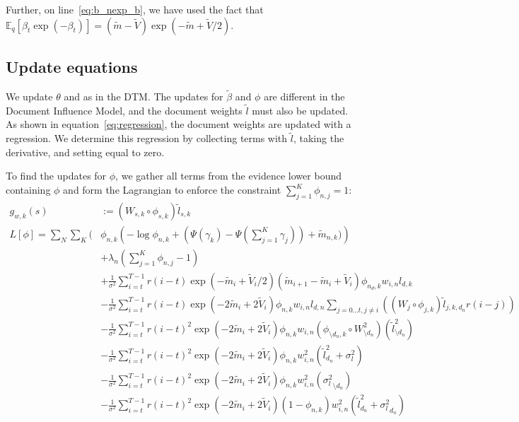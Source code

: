 \documentclass{article}
\newcommand{\mv}{\tilde{m}}
\newcommand{\vv}[0]{\tilde{V}}
\newcommand{\vphi}{\phi}
\newcommand{\bv}{\tilde{\beta}}
\newcommand{\lv}{\tilde{l}}
\newcommand{\vlv}{{\sigma^2_{l}}}
\newcommand{\expectq}[1]{\mathbb{E}_q\left[#1\right]}
\begin{document}
Further, on line~\ref{eq:b_nexp_b}, we have used the fact that
$\expectq{\beta_t \exp(-\beta_t)} = (\mv - \vv) \exp(-\mv + \vv / 2)$.

\subsection{Update equations} \label{section:updates}
We update $\theta$ and as in the DTM.  The updates for $\bv$
and $\vphi$ are different in the Document Influence Model, and the
document weights $\lv$ must also be updated.  As shown in
equation~\ref{eq:regression}, the document weights are updated with a
regression.  We determine this regression by collecting terms with
$\lv$, taking the derivative, and setting equal to zero.

To find the updates for $\phi$, we gather all terms from the evidence
lower bound containing $\phi$ and form the Lagrangian to enforce the
constraint $\sum_{j=1}^K \phi_{n,j} = 1$:
\begin{align*}
g_{w,k}(s) & := (W_{s,k} \circ \phi_{s,k}) \lv_{s,k} \\
L[\phi] = \sum_N \sum_K \Bigg( & \phi_{n,k} \left ( -\log{\phi_{n,k}} + (\Psi(\gamma_k) - \Psi(\sum_{j=1}^K \gamma_j)) + \mv_{n,k}) \right) \\
&     + \lambda_n (\sum_{j=1}^K \phi_{n,j} - 1) \\
&  + \frac{1}{\sigma^2} \sum_{i=t}^{T-1} r(i-t) \exp(-\mv_i + \vv_i / 2) (\mv_{i + 1} - \mv_i + \vv_i) \phi_{n_d,k} w_{i,n} l_{d,k} \\
&  - \frac{1} {\sigma^2} \sum_{i=t}^{T-1} r(i-t) \exp(-2\mv_i + 2 \vv_i) \phi_{n,k} w_{i,n} l_{d,n} \sum_{j=0\ldots t, j \neq i} \left( (W_{j} \circ \phi_{j,k}) \lv_{j,k,d_n} r(i-j) \right) \\
&  - \frac{1} {\sigma^2} \sum_{i=t}^{T-1} r(i-t)^2 \exp(-2\mv_i + 2 \vv_i) \phi_{n,k} w_{i,n} (\phi_{\setminus d_n,k} \circ W_{\setminus d_n}^2) (\lv_{\setminus d_n}^2) \\
&  - \frac{1} {\sigma^2} \sum_{i=t}^{T-1} r(i-t)^2 \exp(-2\mv_i + 2 \vv_i) \phi_{n,k} w_{i,n}^2 (\lv_{d_n}^2 + \sigma_l^2) \\
&  - \frac{1} {\sigma^2} \sum_{i=t}^{T-1} r(i-t)^2 \exp(-2\mv_i + 2 \vv_i) \phi_{n,k} w_{i,n}^2 ({\vlv}_{\setminus d_n}) \\
&  - \frac{1} {\sigma^2} \sum_{i=t}^{T-1} r(i-t)^2 \exp(-2\mv_i + 2 \vv_i) (1 - \phi_{n,k}) w_{i,n}^2 (\lv_{d_n}^2 + {\vlv}_{d_n}) \\
\end{align*}
\end{document}
